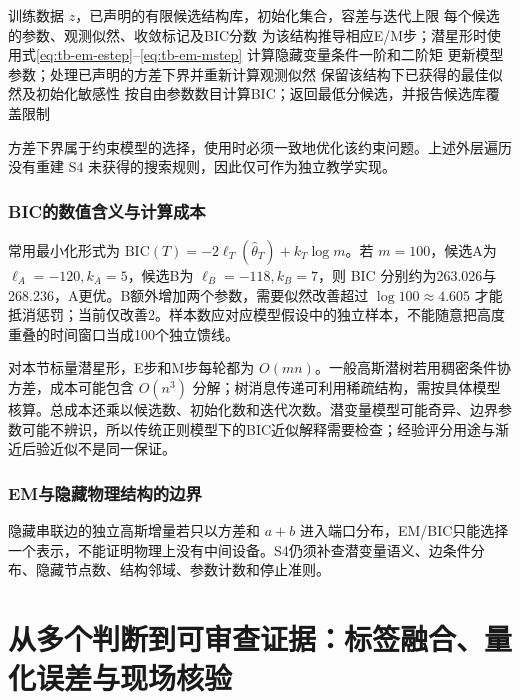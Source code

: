 \documentclass[UTF8,11pt,fontset=fandol,openany,oneside]{ctexbook}
\theoremstyle{definition}
\theoremstyle{remark}
\numberwithin{equation}{chapter}
\begin{document}
\begin{algorithm}[htbp]
\caption{教学算法：固定高斯潜星形模型的EM及外层候选评分}
\begin{algorithmic}[1]
\Require 训练数据 $z$，已声明的有限候选结构库，初始化集合，容差与迭代上限
\Ensure 每个候选的参数、观测似然、收敛标记及BIC分数
\State 为该结构推导相应E/M步；潜星形时使用式\eqref{eq:tb-em-estep}--\eqref{eq:tb-em-mstep}
\Repeat
\State 计算隐藏变量条件一阶和二阶矩
\State 更新模型参数；处理已声明的方差下界并重新计算观测似然
\State 保留该结构下已获得的最佳似然及初始化敏感性
\EndFor
\State 按自由参数数目计算BIC；返回最低分候选，并报告候选库覆盖限制
\end{algorithmic}
\end{algorithm}
方差下界属于约束模型的选择，使用时必须一致地优化该约束问题。上述外层遍历没有重建 S4 未获得的搜索规则，因此仅可作为独立教学实现。

\subsection{BIC的数值含义与计算成本}
常用最小化形式为 $\mathrm{BIC}(T)=-2\ell_T(\widehat\theta_T)+k_T\log m$。若 $m=100$，候选A为 $\ell_A=-120,k_A=5$，候选B为 $\ell_B=-118,k_B=7$，则 BIC 分别约为263.026与268.236，A更优。B额外增加两个参数，需要似然改善超过 $\log100\approx4.605$ 才能抵消惩罚；当前仅改善2。样本数应对应模型假设中的独立样本，不能随意把高度重叠的时间窗口当成100个独立馈线。

对本节标量潜星形，E步和M步每轮都为 $O(mn)$。一般高斯潜树若用稠密条件协方差，成本可能包含 $O(n^3)$ 分解；树消息传递可利用稀疏结构，需按具体模型核算。总成本还乘以候选数、初始化数和迭代次数。潜变量模型可能奇异、边界参数可能不辨识，所以传统正则模型下的BIC近似解释需要检查；经验评分用途与渐近后验近似不是同一保证。

\subsection{EM与隐藏物理结构的边界}
隐藏串联边的独立高斯增量若只以方差和 $a+b$ 进入端口分布，EM/BIC只能选择一个表示，不能证明物理上没有中间设备。S4仍须补查潜变量语义、边条件分布、隐藏节点数、结构邻域、参数计数和停止准则。



\chapter{从多个判断到可审查证据：标签融合、量化误差与现场核验}
\label{ch:data_quality}
\end{document}

